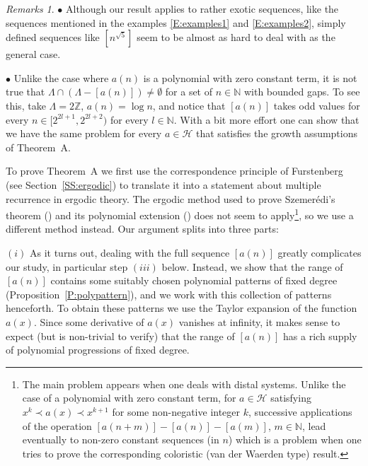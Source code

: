 \documentclass[11pt]{amsart}
\renewcommand{\H}{\mathcal{H}}
\newcommand{\N}{\mathbb{N}}
\newcommand{\Z}{\mathbb{Z}}
\theoremstyle{plain}
\theoremstyle{definition}
\theoremstyle{remark}
\newtheorem*{remarks}{Remarks}
\begin{document}
\begin{remarks}
$\bullet$ Although our result applies to rather exotic sequences, like
    the sequences mentioned in the examples \eqref{E:examples1} and
    \eqref{E:examples2}, simply defined sequences like
    $[n^{\sqrt{5}}]$ seem to be almost as hard to deal with as the
    general case.

$\bullet$ Unlike the case where $a(n)$ is a polynomial with zero constant term, it is not true that
    $\Lambda\cap (\Lambda-[a(n)])\neq \emptyset$ for a set of $n\in\N$
    with bounded gaps. To see this, take $\Lambda=2\Z$, $a(n)=\log n$,
    and notice that $[a(n)]$ takes odd values for every $n\in
    [2^{2l+1},2^{2l+2})$ for every $l\in\N$. With a bit more effort one
    can show that we have the same problem for every $a\in\H$ that  satisfies
    the growth assumptions of  Theorem~A.
\end{remarks}
To prove Theorem~A we first  use the correspondence
principle of Furstenberg  (see Section~\ref{SS:ergodic}) to
translate it into a statement about
multiple recurrence in ergodic theory. The ergodic
method used to prove Szemer\'edi's theorem (\cite{Fu1}) and its
polynomial extension (\cite{BL}) does not seem to apply\footnote{The
  main problem appears when one deals with distal systems. Unlike the
  case of a polynomial with zero constant term, for $a\in \H$
  satisfying $x^k\prec a(x) \prec x^{k+1}$ for some non-negative
  integer $k$, successive applications of the operation
  $[a(n+m)]-[a(n)]-[a(m)]$, $m\in\N$, lead eventually to non-zero
  constant sequences (in $n$) which is a problem when one tries to
  prove the corresponding coloristic (van der Waerden type) result.},
so we  use a different method instead.  Our argument splits into
three parts:

$(i)$ As it turns out, dealing with the full sequence $[a(n)]$ greatly
complicates our study, in particular step $(iii)$ below. Instead,
we show that the range of $[a(n)]$ contains some suitably chosen
polynomial patterns of fixed degree
(Proposition~\ref{P:polypattern}), and we work with this collection of
patterns henceforth.
  To obtain these patterns we use the Taylor expansion of the function
  $a(x)$. Since some derivative of $a(x)$ vanishes at infinity,  it makes sense
  to expect
  (but is non-trivial to verify) that the range of $[a(n)]$ has a rich supply of polynomial progressions
  of fixed degree.
\end{document}
